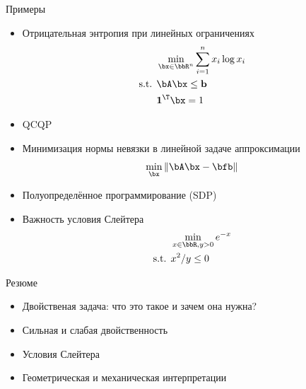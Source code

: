 \documentclass[12pt]{beamer}
\begin{document}
\begin{frame}{Примеры}
\footnotesize
\begin{itemize}
\item Отрицательная энтропия при линейных ограничениях
\vspace{-3mm}
\begin{equation*}
\begin{split}
& \min\limits_{\bx \in \bbR^n} \sum\limits_{i=1}^n x_i \log x_i\\
\text{s.t. } & \bA\bx \leq \mathbf{b}\\
& \mathbf{1}^{\T}\bx = 1
\end{split}
\end{equation*} 
\item QCQP

\item Минимизация нормы невязки в линейной задаче аппроксимации
\[
\min_{\bx} \|\bA\bx - \bfb\|
\]
\item Полуопределённое программирование (SDP)
\item Важность условия Слейтера
\begin{equation*}
\begin{split}
& \min_{x \in \bbR, y > 0} e^{-x}\\
\text{s.t. } & x^2 / y \leq 0
\end{split}
\end{equation*}
\end{itemize}
\end{frame}

\begin{frame}{Резюме}
\begin{itemize}
\item Двойственая задача: что это такое и зачем она нужна?
\item Сильная и слабая двойственность
\item Условия Слейтера
\item Геометрическая и механическая интерпретации
\end{itemize}
\end{frame}
\end{document}
